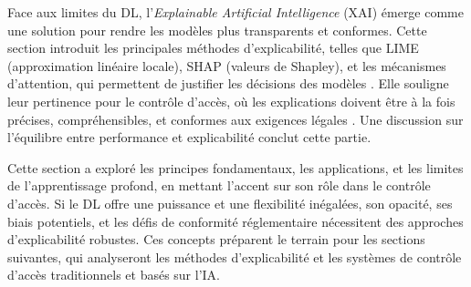 
Face aux limites du DL, l’\textit{Explainable Artificial Intelligence} (XAI) émerge comme une solution pour rendre les modèles plus transparents et conformes. Cette section introduit les principales méthodes d’explicabilité, telles que LIME (approximation linéaire locale), SHAP (valeurs de Shapley), et les mécanismes d’attention, qui permettent de justifier les décisions des modèles \cite{ribeiro2016lime, lundberg2017shap, lin2017structured}. Elle souligne leur pertinence pour le contrôle d’accès, où les explications doivent être à la fois précises, compréhensibles, et conformes aux exigences légales \cite{barredo2020xai}. Une discussion sur l’équilibre entre performance et explicabilité conclut cette partie.

Cette section a exploré les principes fondamentaux, les applications, et les limites de l’apprentissage profond, en mettant l’accent sur son rôle dans le contrôle d’accès. Si le DL offre une puissance et une flexibilité inégalées, son opacité, ses biais potentiels, et les défis de conformité réglementaire nécessitent des approches d’explicabilité robustes. Ces concepts préparent le terrain pour les sections suivantes, qui analyseront les méthodes d’explicabilité et les systèmes de contrôle d’accès traditionnels et basés sur l’IA.
